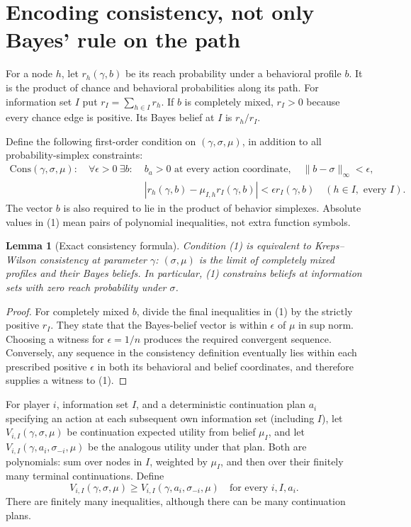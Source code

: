 \documentclass[11pt]{article}
\newtheorem{lemma}[theorem]{Lemma}
\theoremstyle{remark}\newtheorem{remark}[theorem]{Remark}
\begin{document}
\section*{Encoding consistency, not only Bayes' rule on the path}
For a node $h$, let $r_h(\gamma,b)$ be its reach probability under a behavioral profile $b$. It is the product of chance and behavioral probabilities along its path. For information set $I$ put $r_I=\sum_{h\in I}r_h$. If $b$ is completely mixed, $r_I>0$ because every chance edge is positive. Its Bayes belief at $I$ is $r_h/r_I$.

Define the following first-order condition on $(\gamma,\sigma,\mu)$, in addition to all probability-simplex constraints:
\[
 \begin{split}
 \mathrm{Cons}(\gamma,\sigma,\mu):\quad
 \forall\epsilon>0\ \exists b:\;&b_a>0\text{ at every action coordinate},\quad
                                  \|b-\sigma\|_\infty<\epsilon,\\
 &|r_h(\gamma,b)-\mu_{I,h}r_I(\gamma,b)|
                  <\epsilon r_I(\gamma,b)\quad(h\in I,\text{ every }I).
 \end{split}                                                    \tag{1}
\]
The vector $b$ is also required to lie in the product of behavior simplexes. Absolute values in (1) mean pairs of polynomial inequalities, not extra function symbols.

\begin{lemma}[Exact consistency formula]\label{lem:cons}
Condition (1) is equivalent to Kreps--Wilson consistency at parameter $\gamma$: $(\sigma,\mu)$ is the limit of completely mixed profiles and their Bayes beliefs. In particular, (1) constrains beliefs at information sets with zero reach probability under $\sigma$.
\end{lemma}
\begin{proof}
For completely mixed $b$, divide the final inequalities in (1) by the strictly positive $r_I$. They state that the Bayes-belief vector is within $\epsilon$ of $\mu$ in sup norm. Choosing a witness for $\epsilon=1/n$ produces the required convergent sequence. Conversely, any sequence in the consistency definition eventually lies within each prescribed positive $\epsilon$ in both its behavioral and belief coordinates, and therefore supplies a witness to (1).
\end{proof}

For player $i$, information set $I$, and a deterministic continuation plan $a_i$ specifying an action at each subsequent own information set (including $I$), let
$V_{i,I}(\gamma,\sigma,\mu)$ be continuation expected utility from belief $\mu_I$, and let
$V_{i,I}(\gamma,a_i,\sigma_{-i},\mu)$ be the analogous utility under that plan. Both are polynomials: sum over nodes in $I$, weighted by $\mu_I$, and then over their finitely many terminal continuations. Define
\[
 V_{i,I}(\gamma,\sigma,\mu)
 \geq V_{i,I}(\gamma,a_i,\sigma_{-i},\mu)
 \quad\text{for every }i,I,a_i.                                \tag{2}
\]
There are finitely many inequalities, although there can be many continuation plans.
\end{document}
